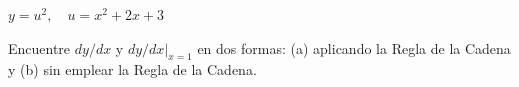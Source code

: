 \item $y = u^2, \quad u = x^2 + 2x + 3$
\par
Encuentre $dy/dx$ y $dy/dx|_{x=1}$ en dos formas: (a) aplicando la Regla de la Cadena y (b) sin emplear la Regla de la Cadena.
